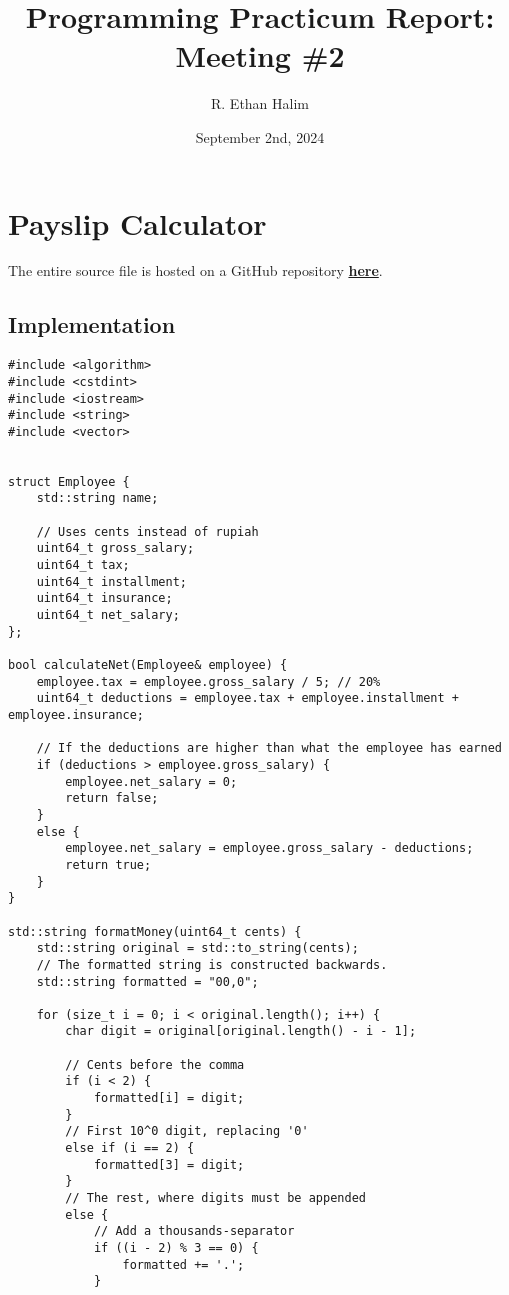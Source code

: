 \documentclass[12pt]{article}
\title{Programming Practicum Report:\\Meeting \#2}
\author{R. Ethan Halim}
\date{September 2nd, 2024}
\begin{document}
\maketitle

\section{Payslip Calculator}
The entire source file is hosted on a GitHub repository \href{https://github.com/avaxar/uni-practica/blob/main/semester-1/2024-09-02/01-payslip.cpp}{\textbf{here}}.

\subsection{Implementation}
\begin{verbatim}
#include <algorithm>
#include <cstdint>
#include <iostream>
#include <string>
#include <vector>


struct Employee {
    std::string name;

    // Uses cents instead of rupiah
    uint64_t gross_salary;
    uint64_t tax;
    uint64_t installment;
    uint64_t insurance;
    uint64_t net_salary;
};

bool calculateNet(Employee& employee) {
    employee.tax = employee.gross_salary / 5; // 20%
    uint64_t deductions = employee.tax + employee.installment + employee.insurance;

    // If the deductions are higher than what the employee has earned
    if (deductions > employee.gross_salary) {
        employee.net_salary = 0;
        return false;
    }
    else {
        employee.net_salary = employee.gross_salary - deductions;
        return true;
    }
}

std::string formatMoney(uint64_t cents) {
    std::string original = std::to_string(cents);
    // The formatted string is constructed backwards.
    std::string formatted = "00,0";

    for (size_t i = 0; i < original.length(); i++) {
        char digit = original[original.length() - i - 1];

        // Cents before the comma
        if (i < 2) {
            formatted[i] = digit;
        }
        // First 10^0 digit, replacing '0'
        else if (i == 2) {
            formatted[3] = digit;
        }
        // The rest, where digits must be appended
        else {
            // Add a thousands-separator
            if ((i - 2) % 3 == 0) {
                formatted += '.';
            }


\end{verbatim}
\end{document}
